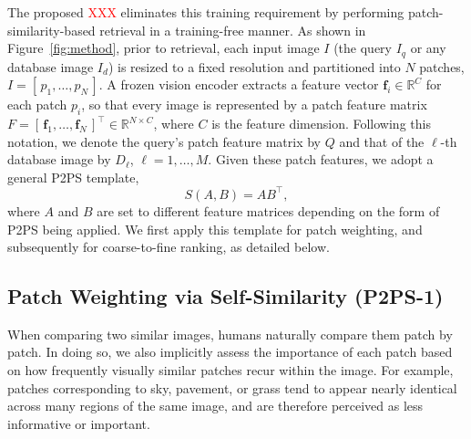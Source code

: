 The proposed \textcolor{red}{XXX} eliminates this training requirement by performing patch-similarity-based retrieval in a training-free manner. As shown in Figure~\ref{fig:method}, prior to retrieval, each input image $I$ (the query $I_q$ or any database image $I_d$) is resized to a fixed resolution and partitioned into $N$ patches, $I=[\,p_1,\dots,p_N\,]$. A frozen vision encoder extracts a feature vector $\mathbf f_i\in\mathbb R^{C}$ for each patch $p_i$, so that every image is represented by a patch feature matrix $F=[\,\mathbf f_1,\dots,\mathbf f_N\,]^{\top}\in\mathbb R^{N\times C}$, where $C$ is the feature dimension. Following this notation, we denote the query's patch feature matrix by $Q$ and that of the $\ell$-th database image by $D_\ell$, $\ell=1,\dots,M$. Given these patch features, we adopt a general P2PS template,
\begin{equation}\label{eq:p2ps}
  S(A,B)=AB^{\top},
\end{equation}
where $A$ and $B$ are set to different feature matrices depending on the form of P2PS being applied. We first apply this template for patch weighting, and subsequently for coarse-to-fine ranking, as detailed below.

\subsection{Patch Weighting via Self-Similarity (P2PS-1)}
\label{sec:feat}
When comparing two similar images, humans naturally compare them patch by patch. In doing so, we also implicitly assess the importance of each patch based on how frequently visually similar patches recur within the image. For example, patches corresponding to sky, pavement, or grass tend to appear nearly identical across many regions of the same image, and are therefore perceived as less informative or important.

